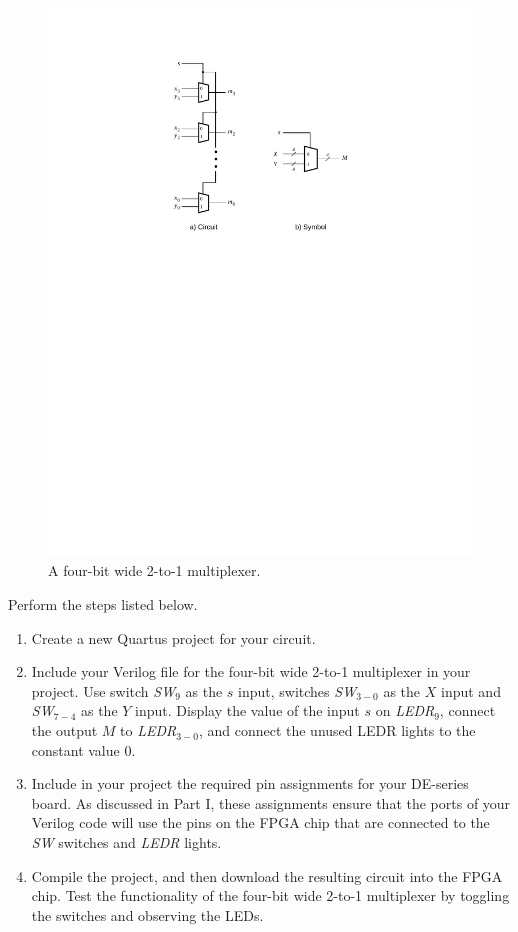 \documentclass[epsfig,10pt,fullpage]{article}
\begin{document}
\begin{figure}[H]
	\begin{center}
		\includegraphics[scale=.8]{figures/figure3.pdf}
	\end{center}
\caption{A four-bit wide 2-to-1 multiplexer.}
\label{fig:3}
\end{figure}

Perform the steps listed below.
\begin{enumerate}
\item Create a new Quartus project for your circuit.
\item Include your Verilog file for the four-bit wide 2-to-1 multiplexer 
in your project. Use switch {\it SW}$_{9}$ as the $s$ input, switches
{\it SW}$_{3-0}$ as the $X$ input and 
{\it SW}$_{7-4}$ as the $Y$ input. Display the value of the input $s$ on {\it LEDR}$_9$,
connect the output $M$ to {\it LEDR}$_{3-0}$, and connect the unused LEDR lights to the constant value 0.
\item Include in your project the required pin assignments for your DE-series board. As discussed
in Part I, these assignments ensure that the ports of your Verilog code will use the pins 
on the FPGA chip that are connected to the {\it SW} switches and {\it LEDR} lights. 
\item Compile the project, and then download the resulting circuit into the FPGA chip. 
Test the functionality of the 
four-bit wide 2-to-1 multiplexer by toggling the switches and observing the LEDs.
\end{enumerate}
\end{document}

